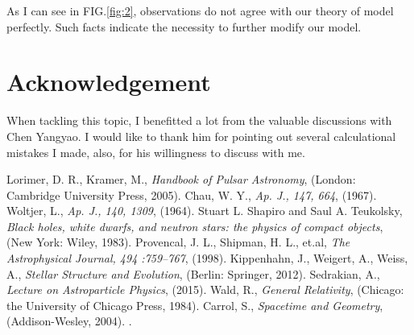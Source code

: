 \documentclass[preprint]{revtex4-1}
\begin{document}
  \begin{table}[!htp]
  	\centering
  	    \caption{Typical White Dwarfs' Mass and Radius}
  \end{table}
  As I can see in FIG.\ref{fig:2}, observations do not agree with our theory of model perfectly. Such facts indicate the necessity to further modify our model.
   
  
  \section*{Acknowledgement}
  When tackling this topic, I benefitted a lot from the valuable discussions with Chen Yangyao. I would like to thank him for pointing out several calculational mistakes I made, also, for his willingness to discuss with me.
  	
\begin{thebibliography}{99}	
 Lorimer, D. R., Kramer, M., \textit{Handbook of Pulsar Astronomy}, (London: Cambridge University Press, 2005).
 Chau, W. Y.,  \textit{Ap. J., 147, 664}, (1967).
 Woltjer, L.,  \textit{Ap. J., 140, 1309}, (1964).
 Stuart L. Shapiro and Saul A. Teukolsky, \textit{Black holes, white dwarfs, and neutron stars: the physics of compact objects}, (New York: Wiley, 1983).
 Provencal, J. L.,  Shipman, H. L., et.al, \textit{The Astrophysical Journal, 494 :759--767}, (1998).
 Kippenhahn, J.,  Weigert, A., Weiss, A., \textit{Stellar Structure and Evolution}, (Berlin: Springer, 2012).
 Sedrakian, A.,  \textit{Lecture on Astroparticle Physics}, (2015).
 Wald, R.,  \textit{General Relativity}, (Chicago: the University of Chicago Press, 1984).
 Carrol, S.,  \textit{Spacetime and Geometry}, (Addison-Wesley, 2004).
.
 \end{thebibliography}
\end{document}
